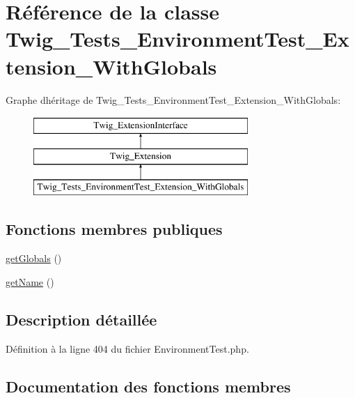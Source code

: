 \hypertarget{class_twig___tests___environment_test___extension___with_globals}{}\section{Référence de la classe Twig\+\_\+\+Tests\+\_\+\+Environment\+Test\+\_\+\+Extension\+\_\+\+With\+Globals}
\label{class_twig___tests___environment_test___extension___with_globals}
Graphe d\textquotesingle{}héritage de Twig\+\_\+\+Tests\+\_\+\+Environment\+Test\+\_\+\+Extension\+\_\+\+With\+Globals\+:\begin{figure}[H]
\begin{center}
\leavevmode
\includegraphics[height=3.000000cm]{class_twig___tests___environment_test___extension___with_globals}
\end{center}
\end{figure}
\subsection*{Fonctions membres publiques}
\begin{DoxyCompactItemize}
\item 
\hyperlink{class_twig___tests___environment_test___extension___with_globals_ae3a26252ce6efe503698085a7ed69dad}{get\+Globals} ()
\item 
\hyperlink{class_twig___tests___environment_test___extension___with_globals_a3d0963e68bb313b163a73f2803c64600}{get\+Name} ()
\end{DoxyCompactItemize}


\subsection{Description détaillée}


Définition à la ligne 404 du fichier Environment\+Test.\+php.



\subsection{Documentation des fonctions membres}
